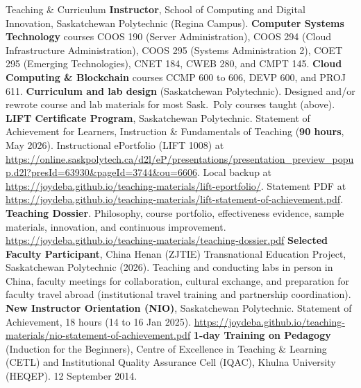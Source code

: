 \begin{rubric}{Teaching \& Curriculum}
\entry*[2024/...]%
	\textbf{Instructor}, School of Computing and Digital Innovation, Saskatchewan Polytechnic (Regina Campus).
	\textbf{Computer Systems Technology} courses COOS 190 (Server Administration), COOS 294 (Cloud Infrastructure Administration), COOS 295 (Systems Administration 2), COET 295 (Emerging Technologies), CNET 184, CWEB 280, and CMPT 145.
	\textbf{Cloud Computing \& Blockchain} courses CCMP 600 to 606, DEVP 600, and PROJ 611.
\vspace{-1mm}
\entry*[Curriculum]%
	\textbf{Curriculum and lab design} (Saskatchewan Polytechnic). Designed and/or rewrote course and lab materials for most Sask.\ Poly courses taught (above).
\vspace{-1mm}
\entry*[LIFT]%
	\textbf{LIFT Certificate Program}, Saskatchewan Polytechnic. Statement of Achievement for Learners, Instruction \& Fundamentals of Teaching (\textbf{90 hours}, May 2026).
	Instructional ePortfolio (LIFT 1008) at \url{https://online.saskpolytech.ca/d2l/eP/presentations/presentation_preview_popup.d2l?presId=63930&pageId=3744&ou=6606}.
	Local backup at \url{https://joydeba.github.io/teaching-materials/lift-eportfolio/}.
	Statement PDF at \url{https://joydeba.github.io/teaching-materials/lift-statement-of-achievement.pdf}.
\vspace{-1mm}
\entry*[Dossier]%
	\textbf{Teaching Dossier}. Philosophy, course portfolio, effectiveness evidence, sample materials, innovation, and continuous improvement.
	\url{https://joydeba.github.io/teaching-materials/teaching-dossier.pdf}
\vspace{-1mm}
\entry*[ZJTIE]%
	\textbf{Selected Faculty Participant}, China Henan ({ZJTIE}) Transnational Education Project, Saskatchewan Polytechnic (2026).
	Teaching and conducting labs in person in China, faculty meetings for collaboration, cultural exchange, and preparation for faculty travel abroad (institutional travel training and partnership coordination).
\vspace{-1mm}
\entry*[NIO]%
	\textbf{New Instructor Orientation (NIO)}, Saskatchewan Polytechnic. Statement of Achievement, 18 hours (14 to 16 Jan 2025).
	\url{https://joydeba.github.io/teaching-materials/nio-statement-of-achievement.pdf}
\vspace{-1mm}
\entry*[CETL]%
	\textbf{1-day Training on Pedagogy} (Induction for the Beginners), Centre of Excellence in Teaching \& Learning ({CETL}) and Institutional Quality Assurance Cell ({IQAC}), Khulna University (HEQEP). 12 September 2014.

\end{rubric}
